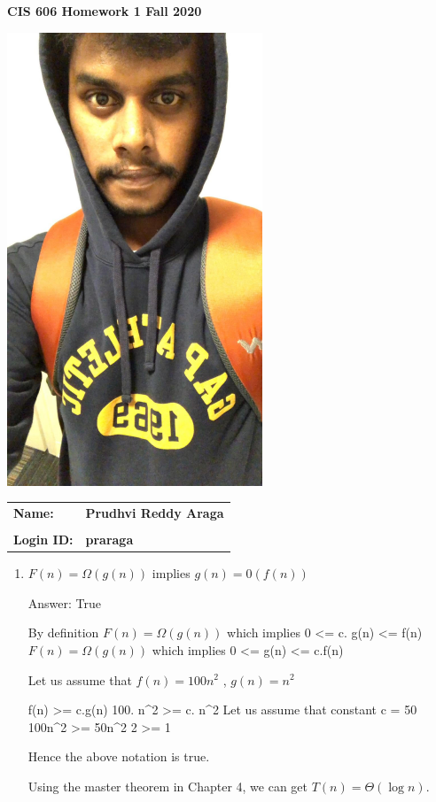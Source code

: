\documentclass[11pt]{article}
\begin{document}
\thispagestyle{plain}

\begin{center}
{\Large \bf CIS 606 \hfil Homework 1 \hfil Fall 2020} \\
\end{center}

\vskip 1in 

\centerline{\includegraphics[width=3in]{Photo.jpg}}

\vskip 0.5in 

\begin{center}
\begin{tabular}{ll}
{\bf Name:}     & {\bf Prudhvi Reddy Araga } \\ \\
{\bf Login ID:} & {\bf praraga }   
\end{tabular}
\end{center}

\newpage

\begin{enumerate}

\itemsep 0.35in
 
\item

$F(n) = \Omega (g(n))$ implies $g(n) = $0$ (f(n))$

Answer: True

By definition
$F(n) = \Omega (g(n))$ which implies  0 \textless{}= c. g(n) \textless{}= f(n)
$F(n) = \Omega (g(n))$ which implies 0 \textless{}=  g(n) \textless{}= c.f(n)

Let us assume that $f(n) = 100n^2$ , $g(n) = n^2$

f(n) \textgreater{}= c.g(n)
100. n\^{}2 \textgreater{}= c. n\^{}2
Let us assume that constant c = 50
100n\^{}2 \textgreater{}= 50n\^{}2
2 \textgreater{}= 1

	Hence the above notation is true.

      Using the master theorem in Chapter 4, we can 
      get $T(n) = \Theta (\log{} n)$.

   
\end{enumerate}
\end{document}
